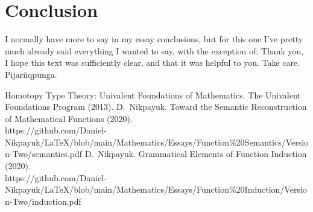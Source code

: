 \documentclass[twoside]{article}
\begin{document}
\section*{Conclusion}

I normally have more to say in my essay conclusions, but for this one I've pretty much already said everything I wanted to say,
with the exception of: Thank you, I hope this text was sufficiently clear, and that it was helpful to you. Take care.
\ \\

Pijariiqpunga.

\vfill

\begin{thebibliography}{99}
 Homotopy Type Theory: Univalent Foundations of Mathematics. The Univalent Foundations Program (2013). 
 D.~Nikpayuk. Toward the Semantic Reconstruction of Mathematical Functions (2020).\\
    https://github.com/Daniel-Nikpayuk/LaTeX/blob/main/Mathematics/Essays/Function\%20Semantics/Version-Two/semantics.pdf
 D.~Nikpayuk. Grammatical Elements of Function Induction (2020).\\
    https://github.com/Daniel-Nikpayuk/LaTeX/blob/main/Mathematics/Essays/Function\%20Induction/Version-Two/induction.pdf
\end{thebibliography}
\end{document}
